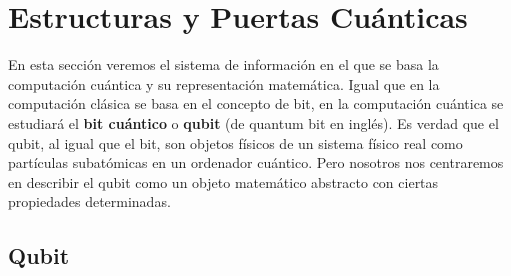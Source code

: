 \documentclass[a4paper]{article}
\numberwithin{equation}{section}
\begin{document}



\newpage

\section{Estructuras y Puertas Cuánticas}

En esta sección veremos el sistema de información en el que se basa la computación cuántica y su representación matemática. Igual que en la computación clásica se basa en el concepto de bit, en la computación cuántica se estudiará el \textbf{bit cuántico} o \textbf{qubit} (de quantum bit en inglés). Es verdad que el qubit, al igual que el bit, son objetos físicos de un sistema físico real como partículas subatómicas en un ordenador cuántico. Pero nosotros nos centraremos en describir el qubit como un objeto matemático abstracto con ciertas propiedades determinadas.


\subsection{Qubit}
\end{document}
